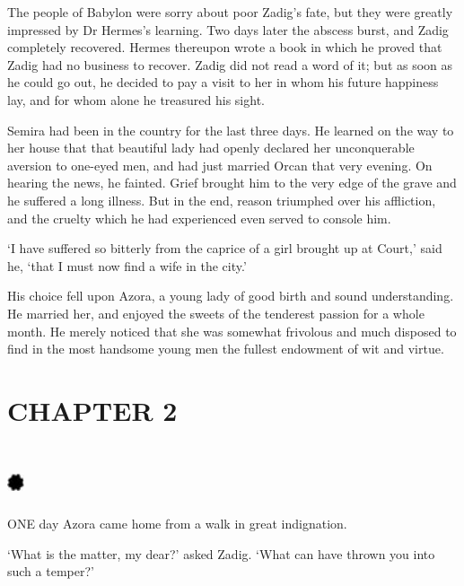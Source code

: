 \documentclass{article}
\begin{document}
\begin{center}
The people of Babylon were sorry about poor Zadig's fate, but they were greatly 
impressed by Dr Hermes's learning. Two days later the abscess burst, and Zadig 
completely recovered. Hermes thereupon wrote a book in which he proved that Zadig 
had no business to recover. Zadig did not read a word of it; but as soon as he 
could go out, he decided to pay a visit to her in whom his future happiness lay, 
and for whom alone he treasured his sight. 

Semira had been in the country for the last three days. He learned on the way to 
her house that that beautiful lady had openly declared her unconquerable aversion 
to one-eyed men, and had just married Orcan that very evening. On hearing the news, 
he fainted. Grief brought him to the very edge of the grave and he suffered a long 
illness. But in the end, reason triumphed over his affliction, and the cruelty 
which he had experienced even served to console him. 

`I have suffered so bitterly from the caprice of a girl brought up at Court,' said 
he, `that I must now find a wife in the city.' 

His choice fell upon Azora, a young lady of good birth and sound understanding. 
He married her, and enjoyed the sweets of the tenderest passion for a whole month. 
He merely noticed that she was somewhat frivolous and much disposed to find in 
the most handsome young men the fullest endowment of wit and virtue.\pagebreak{} 

\section*{\textbf{CHAPTER 2 }}

\section*{%
\includegraphics[width=14pt, height=15pt, keepaspectratio=true]{Zadig or L'Ingenu - Voltaire-fig005.jpg}
}

 

ONE day Azora came home from a walk in great indignation. 

`What is the matter, my dear?' asked Zadig. `What can have thrown you into such 
a temper?' 


\end{center}
\end{document}
